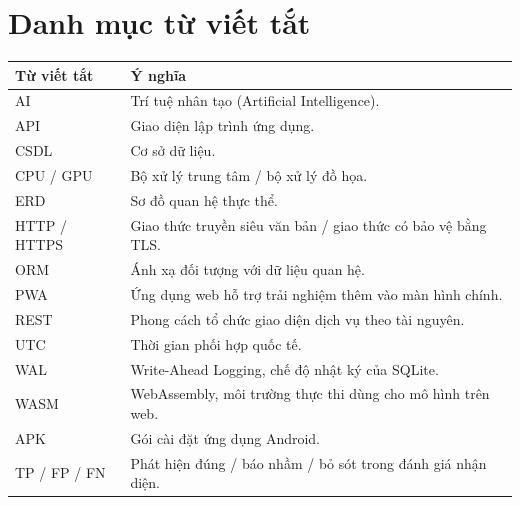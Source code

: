 \chapter*{Danh mục từ viết tắt}
\begin{longtable}{@{}L{2.5cm}L{12.5cm}@{}}
\toprule Từ viết tắt & Ý nghĩa \\\midrule\endhead
AI & Trí tuệ nhân tạo (Artificial Intelligence).\\
API & Giao diện lập trình ứng dụng.\\
CSDL & Cơ sở dữ liệu.\\
CPU / GPU & Bộ xử lý trung tâm / bộ xử lý đồ họa.\\
ERD & Sơ đồ quan hệ thực thể.\\
HTTP / HTTPS & Giao thức truyền siêu văn bản / giao thức có bảo vệ bằng TLS.\\
ORM & Ánh xạ đối tượng với dữ liệu quan hệ.\\
PWA & Ứng dụng web hỗ trợ trải nghiệm thêm vào màn hình chính.\\
REST & Phong cách tổ chức giao diện dịch vụ theo tài nguyên.\\
UTC & Thời gian phối hợp quốc tế.\\
WAL & Write-Ahead Logging, chế độ nhật ký của SQLite.\\
WASM & WebAssembly, môi trường thực thi dùng cho mô hình trên web.\\
APK & Gói cài đặt ứng dụng Android.\\
TP / FP / FN & Phát hiện đúng / báo nhầm / bỏ sót trong đánh giá nhận diện.\\
\bottomrule
\end{longtable}
